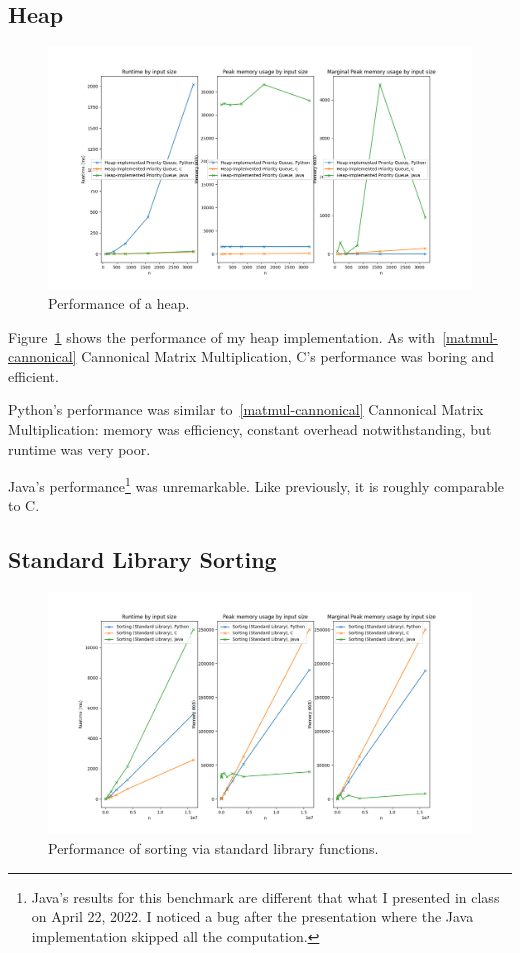 \documentclass[12pt,letterpaper]{article}
\begin{document}
\subsection{Heap}\label{heap}

\begin{figure}[h!]
  \centering
  \includegraphics[width=\textwidth]{./heap-plot.png}
  \caption{Performance of a heap.}
  \label{plot-heap}
\end{figure}

Figure~\ref{plot-heap} shows the performance of my heap implementation. As
with~\ref{matmul-cannonical} Cannonical Matrix Multiplication, C's performance
was boring and efficient.

Python's performance was similar to~\ref{matmul-cannonical} Cannonical Matrix
Multiplication: memory was efficiency, constant overhead notwithstanding, but
runtime was very poor.

Java's performance\footnote{Java's results for this benchmark are different
that what I presented in class on April 22, 2022. I noticed a bug after the
presentation where the Java implementation skipped all the computation.} was
unremarkable. Like previously, it is roughly comparable to C.

\subsection{Standard Library Sorting}\label{sort}

\begin{figure}[h!]
  \centering
  \includegraphics[width=\textwidth]{./sort_stdlib-plot.png}
  \caption{Performance of sorting via standard library functions.}
  \label{plot-sort}
\end{figure}
\end{document}
